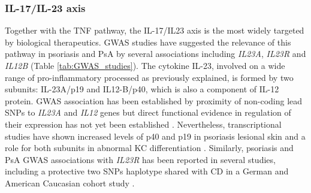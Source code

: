 \subsubsection*{IL-17/IL-23 axis}
Together with the TNF pathway, the IL-17/IL23 axis is the most widely targeted by biological therapeutics. GWAS studies have suggested the relevance of this pathway in psoriasis and PsA by several associations including \textit{IL23A}, \textit{IL23R} and \textit{IL12B} (Table \ref{tab:GWAS_studies}). %
The cytokine IL-23, involved on a wide range of pro-inflammatory processed as previously explained, is formed by two subunits: IL-23A/p19 and IL12-B/p40, which is also a component of IL-12 protein. GWAS association has been established by proximity of non-coding lead SNPs to \textit{IL23A} and \textit{IL12} genes but direct functional evidence in regulation of their expression has not yet been established \parencite{Cargill2007,Strange2010,Tsoi2012}. Nevertheless, transcriptional studies have shown increased levels of p40 and p19 in psoriasis lesional skin and a role for both subunits in abnormal KC differentiation \parencite{Lee2004,Zhu2011}. Similarly, psoriasis and PsA GWAS associations with \textit{IL23R} has been reported in several studies, including a protective two SNPs haplotype shared with CD in a German and American Caucasian cohort study \parencite{Nair2008, Strange2010, Tsoi2012}. %

